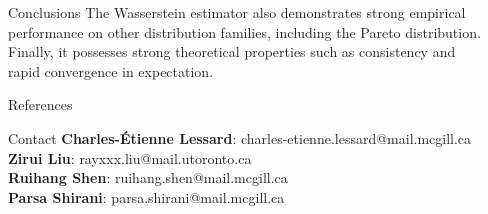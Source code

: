\documentclass[final]{beamer}
\newlength{\sepwidth}
\newlength{\colwidth}
\newcommand{\separatorcolumn}{\begin{column}{\sepwidth}\end{column}}
\begin{document}
\begin{frame}[t]
\begin{columns}[t]
\begin{column}{\colwidth}
\begin{block}{Conclusions}
     The Wasserstein estimator also demonstrates strong empirical performance on other distribution families, including the Pareto distribution. Finally, it possesses strong theoretical properties such as consistency and rapid convergence in expectation. 

  \end{block}

  \begin{block}{References}

    \nocite{*}
    \footnotesize{}
     

  \end{block}

  \begin{block}{Contact}
  \textbf{Charles-Étienne Lessard}: charles-etienne.lessard@mail.mcgill.ca \\
  \textbf{Zirui Liu}: rayxxx.liu@mail.utoronto.ca\\
  \textbf{Ruihang Shen}: ruihang.shen@mail.mcgill.ca\\
  \textbf{Parsa Shirani}: parsa.shirani@mail.mcgill.ca \\ 
  
      
  \end{block}

\end{column}

\separatorcolumn
\end{columns}
\end{frame}
\end{document}
